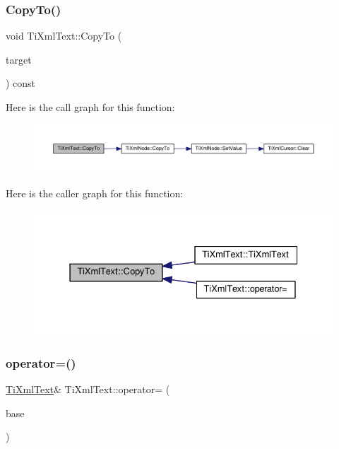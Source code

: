 \subsubsection{\texorpdfstring{Copy\+To()}{CopyTo()}}
{\footnotesize\ttfamily void Ti\+Xml\+Text\+::\+Copy\+To (\begin{DoxyParamCaption}\item[{\hyperlink{class_ti_xml_text}{Ti\+Xml\+Text} $\ast$}]{target }\end{DoxyParamCaption}) const\hspace{0.3cm}{\ttfamily [protected]}}

Here is the call graph for this function\+:
\nopagebreak
\begin{figure}[H]
\begin{center}
\leavevmode
\includegraphics[width=350pt]{class_ti_xml_text_a480b8e0ad6b7833a73ecf2191195c9b5_cgraph}
\end{center}
\end{figure}
Here is the caller graph for this function\+:
\nopagebreak
\begin{figure}[H]
\begin{center}
\leavevmode
\includegraphics[width=331pt]{class_ti_xml_text_a480b8e0ad6b7833a73ecf2191195c9b5_icgraph}
\end{center}
\end{figure}
\mbox{\label{class_ti_xml_text_aed5b13f9c1b804c616fd533882c29f57}} 
\subsubsection{\texorpdfstring{operator=()}{operator=()}}
{\footnotesize\ttfamily \hyperlink{class_ti_xml_text}{Ti\+Xml\+Text}\& Ti\+Xml\+Text\+::operator= (\begin{DoxyParamCaption}\item[{const \hyperlink{class_ti_xml_text}{Ti\+Xml\+Text} \&}]{base }\end{DoxyParamCaption})\hspace{0.3cm}{\ttfamily [inline]}}

